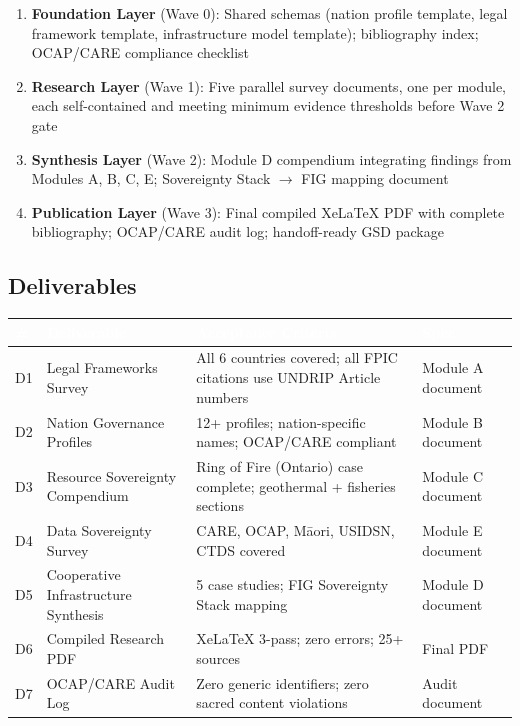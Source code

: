 \documentclass[11pt,letterpaper]{article}
\newcommand{\tableheader}[1]{\textbf{\sffamily\textcolor{white}{#1}}}
\begin{document}
\begin{enumerate}
  \item \textbf{Foundation Layer} (Wave 0): Shared schemas (nation profile template, legal framework template, infrastructure model template); bibliography index; OCAP/CARE compliance checklist
  \item \textbf{Research Layer} (Wave 1): Five parallel survey documents, one per module, each self-contained and meeting minimum evidence thresholds before Wave 2 gate
  \item \textbf{Synthesis Layer} (Wave 2): Module D compendium integrating findings from Modules A, B, C, E; Sovereignty Stack $\to$ FIG mapping document
  \item \textbf{Publication Layer} (Wave 3): Final compiled XeLaTeX PDF with complete bibliography; OCAP/CARE audit log; handoff-ready GSD package
\end{enumerate}

\subsection{Deliverables}

\begin{center}
\begin{tabularx}{\textwidth}{C{0.8cm}L{3.5cm}L{4cm}X}
\toprule
{}
\tableheader{\#} & \tableheader{Deliverable} & \tableheader{Acceptance Criteria} & \tableheader{Spec} \\
\midrule
D1 & Legal Frameworks Survey & All 6 countries covered; all FPIC citations use UNDRIP Article numbers & Module A document \\
D2 & Nation Governance Profiles & 12+ profiles; nation-specific names; OCAP/CARE compliant & Module B document \\
D3 & Resource Sovereignty Compendium & Ring of Fire (Ontario) case complete; geothermal + fisheries sections & Module C document \\
D4 & Data Sovereignty Survey & CARE, OCAP, Māori, USIDSN, CTDS covered & Module E document \\
D5 & Cooperative Infrastructure Synthesis & 5 case studies; FIG Sovereignty Stack mapping & Module D document \\
D6 & Compiled Research PDF & XeLaTeX 3-pass; zero errors; 25+ sources & Final PDF \\
D7 & OCAP/CARE Audit Log & Zero generic identifiers; zero sacred content violations & Audit document \\
\bottomrule
\end{tabularx}
\end{center}
\end{document}
